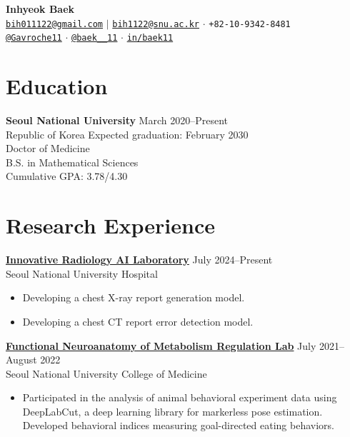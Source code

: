 \documentclass[10pt, a4paper]{article}
\newenvironment{customitemize}
	{\begin{itemize}[leftmargin=*, noitemsep, topsep=0pt, label=$\cdot$]}
	{\end{itemize}}
\begin{document}
\begin{center}
    {\Large\textbf{\color{mycolor}Inhyeok Baek}} \\[2mm]
    \small
    \faEnvelope\hspace{1mm}\href{mailto:bih011122@gmail.com}{\texttt{bih011122@gmail.com}} $\vert$ \href{mailto:bih1122@snu.ac.kr}{\texttt{bih1122@snu.ac.kr}}
    \hspace{2mm}$\cdot$\hspace{2mm}
    \faPhone\hspace{1mm}\texttt{+82-10-9342-8481} \\[1mm]
    \faGithub\hspace{1mm}\href{https://github.com/gavroche11}{\texttt{@Gavroche11}}
    \hspace{2mm}$\cdot$\hspace{2mm}
    {}\hspace{1mm}\href{https://x.com/baek__11}{\texttt{@baek\_\_11}}
    \hspace{2mm}$\cdot$\hspace{2mm}
    \faLinkedin\hspace{1mm}\href{https://www.linkedin.com/in/baek11/}{\texttt{in/baek11}}
\end{center}

\section*{Education}
\textbf{Seoul National University} \hfill March 2020--Present \\
Republic of Korea \hfill Expected graduation: February 2030 \smallskip\\
Doctor of Medicine\\
B.S. in Mathematical Sciences \smallskip\\
Cumulative GPA: 3.78/4.30

\section*{Research Experience}
\textbf{\href{http://irail.snu.ac.kr}{Innovative Radiology AI Laboratory}} \hfill July 2024--Present\\
Seoul National University Hospital \smallskip
\begin{customitemize}
    \item Developing a chest X-ray report generation model.
    \item Developing a chest CT report error detection model.
\end{customitemize}
\bigskip
\textbf{\href{https://fnmr.snu.ac.kr/}{Functional Neuroanatomy of Metabolism Regulation Lab}} \hfill July 2021--August 2022\\
Seoul National University College of Medicine \smallskip
\begin{customitemize}
    \item Participated in the analysis of animal behavioral experiment data using DeepLabCut, a deep learning library for markerless pose estimation. Developed behavioral indices measuring goal-directed eating behaviors.
\end{customitemize}
\end{document}
